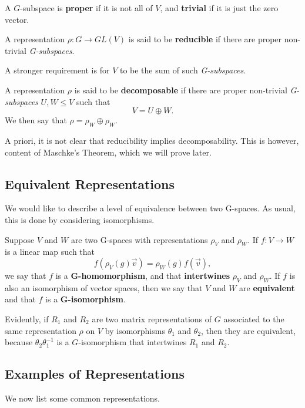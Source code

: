 \documentclass[a4paper]{article}
\begin{document}
A $G$-subspace is \textbf{proper} if it is not all of $V$, and \textbf{trivial} if it is just the zero vector.

\begin{defi}[Reducible]
    A representation $\rho: G \to GL(V)$ is said to be \textbf{reducible} if there are proper non-trivial \textit{G-subspaces}.
\end{defi}

A stronger requirement is for $V$ to be the sum of such \textit{G-subspaces}.

\begin{defi}[Decomposable]
    A representation $\rho$ is said to be \textbf{decomposable} if there are proper non-trivial \textit{G-subspaces} $U,W \leq V$ such that $$V = U \oplus W.$$ We then say that $\rho = \rho_W \oplus \rho_W$.
\end{defi}

A priori, it is not clear that reducibility implies decomposability. This is however, content of Maschke's Theorem, which we will prove later.

\subsection{Equivalent Representations}
We would like to describe a level of equivalence between two G-spaces. As usual, this is done by considering isomorphisms.

\begin{defi}[G-homomorphism]
    Suppose $V$ and $W$ are two G-spaces with representations $\rho_V$ and $\rho_W$. If $f: V \to W$ is a linear map such that $$f(\rho_V(g)\vec{v}) = \rho_W(g)f(\vec{v}),$$ we say that $f$ is a \textbf{G-homomorphism}, and that \textbf{intertwines} $\rho_V$ and $\rho_W$. If $f$ is also an isomorphism of vector spaces, then we say that $V$ and $W$ are \textbf{equivalent} and that $f$ is a \textbf{G-isomorphism}.
\end{defi}

Evidently, if $R_1$ and $R_2$ are two matrix representations of $G$ associated to the same representation $\rho$ on $V$ by isomorphisms $\theta_1$ and $\theta_2$, then they are equivalent, because $\theta_2 \theta_1^{-1}$ is a $G$-isomorphism that intertwines $R_1$ and $R_2$. 

\subsection{Examples of Representations}
We now list some common representations. 
\end{document}
